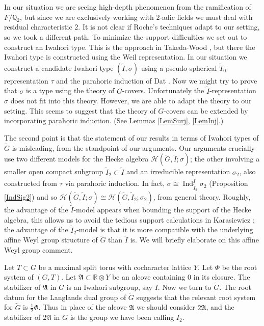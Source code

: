 \documentclass[10pt, letterpaper]{amsart}
\theoremstyle{plain}
\theoremstyle{definition}
\numberwithin{equation}{section}
\newcommand{\Gt}{\widetilde{G}}
\newcommand{\It}{\widetilde{I}}
\newcommand{\Tt}{\widetilde{T}}
\newcommand{\Ind}{\operatorname{Ind}}
\newcommand{\Hcal}{\mathcal{H}}
\begin{document}
In our situation we are seeing high-depth phenomenon from the ramification of $F/\mathbb{Q}_{2}$, but since we are exclusively working with $2$-adic fields we must deal with residual characteristic $2$. It is not clear if Roche's techniques adapt to our setting, so we took a different path. To minimize the support difficulties we set out to construct an Iwahori type. This is the approach in Takeda-Wood \cite{Takeda_Wood}, but there the Iwahori type is constructed using the Weil representation. In our situation we construct a candidate  Iwahori type $(\It,\sigma)$ using a pseudo-spherical $\Tt_{0}$-representation $\tau$ and the parahoric induction of Dat \cite{D09}. Now we might try to prove that $\sigma$ is a type using the theory of $G$-covers. Unfortunately the $\It$-representation $\sigma$ does not fit into this theory. However, we are able to adapt the theory to our setting. This seems to suggest that the theory of $G$-covers can be extended by incorporating parahoric induction. (See Lemmas \ref{LemSurj}, \ref{LemInj}.)

The second point is that the statement of our results in terms of Iwahori types of $\Gt$ is misleading, from the standpoint of our arguments. Our arguments crucially use two different models for the Hecke algebra $\Hcal(\Gt, \It; \sigma)$; the other involving a smaller open compact subgroup $\It_{2}\subset \It$ and an irreducible representation $\sigma_{2}$, also constructed from $\tau$ via parahoric induction. In fact, $\sigma\cong \Ind_{\It_{2}}^{\It}\sigma_{2}$ (Proposition \ref{IndSig2}) and so $\Hcal(\Gt, \It; \sigma)\cong \Hcal(\Gt, \It_{2}; \sigma_{2})$, from general theory. Roughly, the advantage of the $\It$-model appears when bounding the support of the Hecke algebra, this allows us to avoid the tedious support calculations in Karasiewicz \cite{Karasiewicz}; the advantage of the $\It_{2}$-model is that it is more compatible with the underlying affine Weyl group structure of $\Gt$ than $\It$ is. We will briefly elaborate on this affine Weyl group comment.

Let $T\subset G$ be a maximal split torus with cocharacter lattice $Y$. Let $\Phi$ be the root system of $(G,T)$. Let $\mathfrak{A}\subset \mathbb{R}\otimes Y$ be an alcove containing $0$ in its closure. The stabilizer of $\mathfrak{A}$ in $G$ is an Iwahori subgroup, say $I$. Now we turn to $\Gt$. The root datum for the Langlands dual group of $\Gt$ suggests that the relevant root system for $\Gt$ is $\frac{1}{2}\Phi$. Thus in place of the alcove $\mathfrak{A}$ we should consider $2\mathfrak{A}$, and the stabilizer of $2\mathfrak{A}$ in $G$ is the group we have been calling $I_{2}$.
\end{document}
